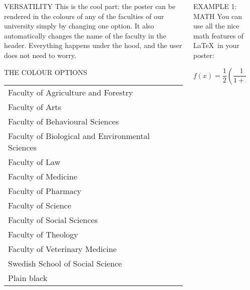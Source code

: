 \documentclass[final]{beamer}
\begin{document}
\begin{frame}[t, fragile]
\begin{columns}[T]
\begin{column}{0.32\linewidth}
\end{column}

\begin{column}{0.32\linewidth}

\begin{block}{VERSATILITY}
This is the cool part: the poster can be rendered in the colours of any of the faculties of our university simply by changing one option. It also automatically changes the name of the faculty in the header. Everything happens under the hood, and the user does not need to worry.

\end{block}

\begin{block}{THE COLOUR OPTIONS}

\begin{center}
\begin{tabular}{l}
Faculty of Agriculture and Forestry \\
Faculty of Arts \\
Faculty of Behavioural Sciences \\
Faculty of Biological and Environmental Sciences \\
Faculty of Law \\
Faculty of Medicine \\
Faculty of Pharmacy \\
Faculty of Science \\
Faculty of Social Sciences \\
Faculty of Theology \\
Faculty of Veterinary Medicine \\
Swedish School of Social Science \\
Plain black
\end{tabular}
\end{center}

\end{block}




\end{column}

\begin{column}{0.32\linewidth}

\begin{block}{EXAMPLE 1: MATH}
	You can use all the nice math features of \LaTeX~in your poster:

	\begin{equation}
		f(x) = \frac{1}{2}\left(\frac{1}{1+x} + 1\right)
	\end{equation}	


\end{block}
\end{column}
\end{columns}
\end{frame}
\end{document}
